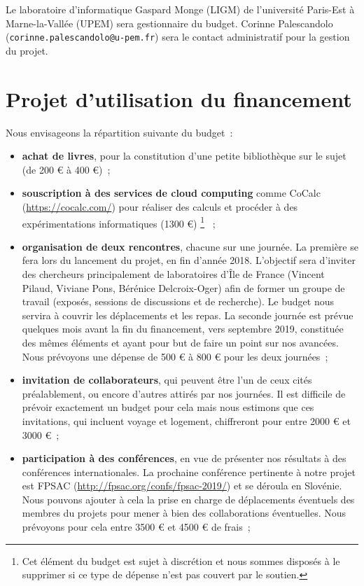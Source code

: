 \documentclass[a4paper, 10pt]{article}
\numberwithin{equation}{subsection}
\begin{document}
Le laboratoire d'informatique Gaspard Monge (LIGM) de l'université
Paris-Est à Marne-la-Vallée (UPEM) sera gestionnaire du
budget. Corinne Palescandolo (\texttt{corinne.palescandolo@u-pem.fr})
sera le contact administratif pour la gestion du projet.

\section{Projet d'utilisation du financement}
Nous envisageons la répartition suivante du budget~:
\begin{itemize}
    \item {\bf achat de livres}, pour la constitution d'une petite
    bibliothèque sur le sujet (de 200 € à 400 €)~;
    \smallbreak

    \item {\bf souscription à des services de cloud computing} comme
    {\sc CoCalc} (\url{https://cocalc.com/}) pour réaliser des calculs
    et procéder à des expérimentations informatiques (1300 €)%
    \footnote{Cet élément du budget est sujet à discrétion et nous
    sommes disposés à le supprimer si ce type de dépense n'est pas
    couvert par le soutien.}%
    ~;
    \smallbreak

    \item {\bf organisation de deux rencontres}, chacune sur une
    journée. La
    première se fera lors du lancement du projet, en fin d'année 2018.
    L'objectif sera d'inviter des chercheurs principalement de
    laboratoires d'Île de France (Vincent Pilaud, Viviane Pons,
    Bérénice Delcroix-Oger) afin de former un groupe de travail
    (exposés, sessions de discussions et de recherche). Le budget
    nous servira à couvrir les déplacements et les repas. La
    seconde journée est prévue quelques mois avant la fin du
    financement, vers septembre 2019, constituée des mêmes éléments et
    ayant pour but de faire un point sur nos avancées. Nous
    prévoyons une dépense de 500 € à 800 € pour les deux journées~;
    \smallbreak

    \item {\bf invitation de collaborateurs}, qui peuvent être l'un de
    ceux cités préalablement, ou encore d'autres attirés par nos
    journées. Il est difficile de prévoir exactement un budget pour cela
    mais nous estimons que ces invitations, qui incluent voyage et
    logement, chiffreront pour entre 2000 € et 3000 €~;
    \smallbreak

    \item {\bf participation à des conférences}, en vue de présenter
    nos résultats à des conférences internationales. La prochaine
    conférence pertinente à notre projet est FPSAC
    (\url{http://fpsac.org/confs/fpsac-2019/}) et se déroula en Slovénie.
    Nous pouvons ajouter à cela la prise en charge de déplacements
    éventuels des membres du projets pour mener à bien des collaborations
    éventuelles.
    Nous prévoyons pour cela entre 3500 € et 4500 € de frais~;
\end{itemize}
\medbreak
\end{document}
